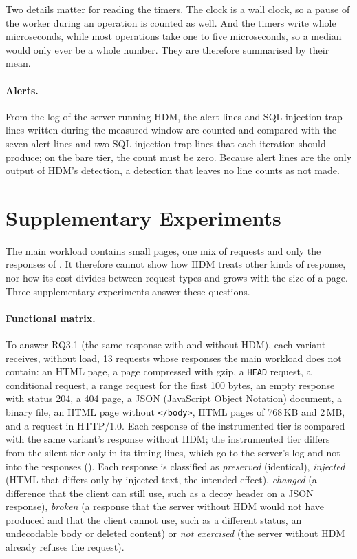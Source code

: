\documentclass{rptuma}
\begin{document}
Two details matter for reading the timers. The clock is a wall clock, so a pause of the worker
during an operation is counted as well. And the timers write whole microseconds, while most
operations take one to five microseconds, so a median would only ever be a whole number. They are
therefore summarised by their mean.

\paragraph{Alerts.} From the log of the server running HDM, the alert lines and SQL-injection trap lines written during the measured
window are counted and compared with the seven alert lines and two SQL-injection trap lines that each iteration should
produce; on the bare tier, the count must be zero. Because alert lines are the only output of HDM's
detection, a detection that leaves no line counts as not made.

\section{Supplementary Experiments}
\label{sec:method.supp}

The main workload contains small pages, one mix of requests and only the responses of
. It therefore cannot show how HDM treats other kinds of response, nor how
its cost divides between request types and grows with the size of a page. Three supplementary
experiments answer these questions.

\paragraph{Functional matrix.} To answer RQ3.1 (the same response with and without HDM), each variant receives, without load, 13
requests whose responses the main workload does not contain: an HTML page, a page compressed with
gzip, a \texttt{HEAD} request, a conditional request, a range request for the first 100 bytes, an
empty response with status 204, a 404 page, a JSON (JavaScript Object Notation) document, a binary file, an HTML page without
\texttt{</body>}, HTML pages of 768\,KB and 2\,MB, and a request in HTTP/1.0. Each response of the
instrumented tier is compared with the same variant's response without HDM; the instrumented tier
differs from the silent tier only in its timing lines, which go to the server's log and not into the
responses (). Each response is classified as
\emph{preserved} (identical), \emph{injected} (HTML that differs only by injected text, the intended
effect), \emph{changed} (a difference that the client can still use, such as a decoy header on a
JSON response), \emph{broken} (a response that the server without HDM would not have produced and that
the client cannot use, such as a different status, an undecodable body or deleted content) or \emph{not exercised}
(the server without HDM already refuses the request).
\end{document}
